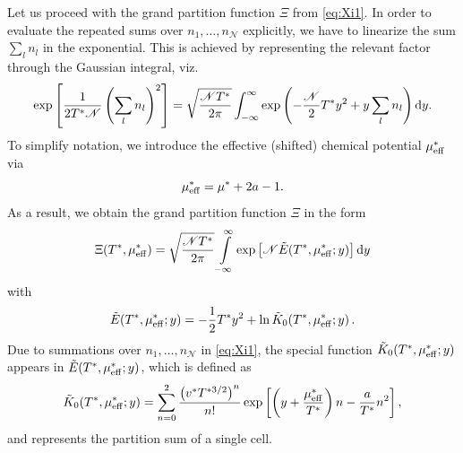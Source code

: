\documentclass[pdflatex,sn-mathphys-num]{sn-jnl}%
\theoremstyle{thmstyleone}%
\theoremstyle{thmstyletwo}%
\theoremstyle{thmstylethree}%
\begin{document}
	Let us proceed with the grand partition function $\Xi$ from \eqref{eq:Xi1}.
	In order to evaluate the repeated sums over $n_1,\ldots,n_{\mathscr{N}}$ explicitly, we have to linearize the sum $\sum_l n_l$ in the exponential. This is achieved by representing the relevant factor through the Gaussian integral, viz.
	\begin{equation}
		\exp\left[\frac{1}{2T^*\mathscr{N}} \left(\sum_l n_l\right)^2\right] = \sqrt{\frac{\mathscr{N}T^*}{2\pi}} \int_{-\infty}^{\infty} \exp\left(-\frac{\mathscr{N}}{2}T^* y^2 + y \sum_l n_l\right) {\rm d} y.
	\end{equation}
	To simplify notation, we introduce the effective (shifted) chemical potential $\mu_{\rm eff}^*$ via
	\begin{equation}
		\mu_{\rm eff}^* = \mu^* + 2a -1.
	\end{equation}
	As a result, we obtain the grand partition function $\Xi$ in the form
	\begin{equation}
		\label{Y1}
		\Xi(T^*,\mu_{\rm eff}^*) = \sqrt{\frac{\mathscr{N} T^*}{2\pi}} \int\limits_{-\infty}^{\infty} \exp\left[\mathscr{N} \tilde{E}(T^*,\mu_{\rm eff}^*; y)\right] {\rm d} y
	\end{equation}
	with
	\begin{equation}
		\tilde{E}(T^*,\mu_{\rm eff}^*; y) = -\frac{1}{2}T^* y^2 + \ln \tilde{K}_0(T^*,\mu_{\rm eff}^*;y)\, .
	\end{equation}
	Due to summations over $n_1,\ldots,n_{\mathscr{N}}$ in \eqref{eq:Xi1}, the  special function $\tilde{K}_0(T^*,\mu_{\rm eff}^*;y)$ appears in $\tilde{E}(T^*,\mu_{\rm eff}^*; y)$, which is defined as
	\begin{equation}
		\label{Y3}
		\tilde{K}_0(T^*,\mu_{\rm eff}^*; y) = \sum_{n=0}^{2} \frac{\left(v^* T^{*3/2}\right)^n}{n!} \exp \left[\left(y + \frac{\mu_{\rm eff}^*}{T^*}\right)n - \frac{a}{T^*}n^2\right],
	\end{equation}
	and represents the partition sum of a single cell.
	
\end{document}
